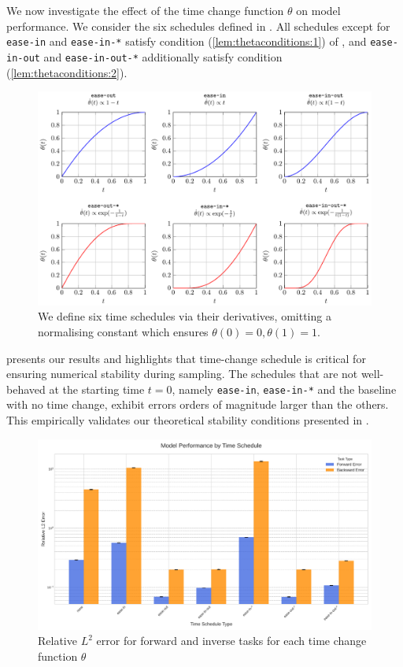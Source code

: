 We now investigate the effect of the time change function \(\theta\) on model performance. We consider the six schedules defined in . All schedules except for \texttt{ease-in} and \texttt{ease-in-*} satisfy condition (\ref{lem:thetaconditions:1}) of , and \texttt{ease-in-out} and \texttt{ease-in-out-*} additionally satisfy condition (\ref{lem:thetaconditions:2}).

\begin{figure}[tbhp]
\centering
\includegraphics[width=\linewidth]{schedules.pdf}
\caption{We define six time schedules via their derivatives, omitting a normalising constant which ensures \(\theta(0) = 0, \theta(1)=1\). }\label{fig:schedules}
\end{figure}

 presents our results and highlights that  time-change schedule is critical for ensuring numerical stability during sampling. The schedules that are not well-behaved at the starting time \(t=0\), namely \texttt{ease-in}, \texttt{ease-in-*} and the baseline with no time change, exhibit errors orders of magnitude larger than the others. This empirically validates our theoretical stability conditions presented in .

\begin{figure}[tbhp]
\centering
\includegraphics[width=\linewidth]{schedules.png}
\caption{Relative \(L^{2}\) error for forward and inverse tasks for each time change function \(\theta\)}\label{fig:schedulesr}
\end{figure}

